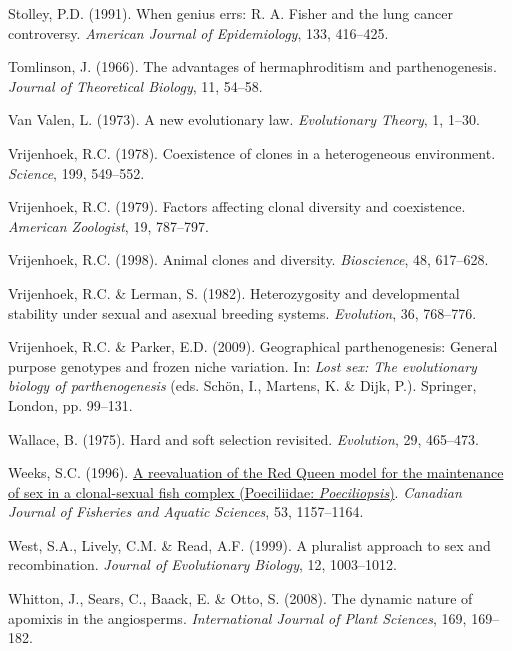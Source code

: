 \documentclass[
  letterpaper,
]{book}
\newlength{\cslhangindent}
\newenvironment{CSLReferences}[2] %
 {\begin{list}{}{%
  \setlength{\itemindent}{0pt}
  \setlength{\leftmargin}{0pt}
  \setlength{\parsep}{0pt}
  \ifodd #1
   \setlength{\leftmargin}{\cslhangindent}
   \setlength{\itemindent}{-1\cslhangindent}
  \fi
  \setlength{\itemsep}{#2\baselineskip}}}
 {\end{list}}
\begin{document}
\begin{CSLReferences}{1}{0}
Stolley, P.D. (1991). When genius errs: R. A. Fisher and the lung cancer
controversy. \emph{American Journal of Epidemiology}, 133, 416--425.

Tomlinson, J. (1966). The advantages of hermaphroditism and
parthenogenesis. \emph{Journal of Theoretical Biology}, 11, 54--58.

Van Valen, L. (1973). A new evolutionary law. \emph{Evolutionary
Theory}, 1, 1--30.

Vrijenhoek, R.C. (1978). Coexistence of clones in a heterogeneous
environment. \emph{Science}, 199, 549--552.

Vrijenhoek, R.C. (1979). Factors affecting clonal diversity and
coexistence. \emph{American Zoologist}, 19, 787--797.

Vrijenhoek, R.C. (1998). Animal clones and diversity. \emph{Bioscience},
48, 617--628.

Vrijenhoek, R.C. \& Lerman, S. (1982). Heterozygosity and developmental
stability under sexual and asexual breeding systems. \emph{Evolution},
36, 768--776.

Vrijenhoek, R.C. \& Parker, E.D. (2009). Geographical parthenogenesis:
General purpose genotypes and frozen niche variation. In: \emph{Lost
sex: The evolutionary biology of parthenogenesis} (eds. Schön, I.,
Martens, K. \& Dijk, P.). Springer, London, pp. 99--131.

Wallace, B. (1975). Hard and soft selection revisited. \emph{Evolution},
29, 465--473.

Weeks, S.C. (1996). \href{https://doi.org/10.1139/f96-041}{A
reevaluation of the {Red Queen} model for the maintenance of sex in a
clonal-sexual fish complex ({Poeciliidae}: \emph{{P}oeciliopsis})}.
\emph{Canadian Journal of Fisheries and Aquatic Sciences}, 53,
1157--1164.

West, S.A., Lively, C.M. \& Read, A.F. (1999). A pluralist approach to
sex and recombination. \emph{Journal of Evolutionary Biology}, 12,
1003--1012.

Whitton, J., Sears, C., Baack, E. \& Otto, S. (2008). The dynamic nature
of apomixis in the angiosperms. \emph{International Journal of Plant
Sciences}, 169, 169--182.


\end{CSLReferences}
\end{document}
